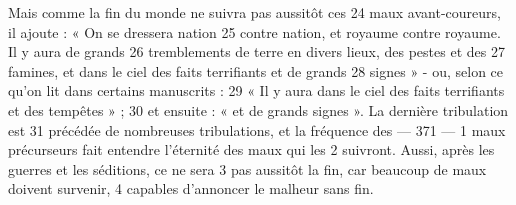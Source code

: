 Mais comme la fin du monde ne suivra pas aussitôt ces	 
24	 	maux avant-coureurs, il ajoute : « On se dressera nation	 
25	 	contre nation, et royaume contre royaume. Il y aura de grands	 
26	 	tremblements de terre en divers lieux, des pestes et des	 
27	 	famines, et dans le ciel des faits terrifiants et de grands	 
28	 	signes » - ou, selon ce qu'on lit dans certains manuscrits :	 
29	 	« Il y aura dans le ciel des faits terrifiants et des tempêtes » ;	 
30	 	et ensuite : « et de grands signes ». La dernière tribulation est	 
31	 	précédée de nombreuses tribulations, et la fréquence des	 
 	--- 371 ---	 
1	 	maux précurseurs fait entendre l'éternité des maux qui les	 
2	 	suivront. Aussi, après les guerres et les séditions, ce ne sera	 
3	 	pas aussitôt la fin, car beaucoup de maux doivent survenir,	 
4	 	capables d'annoncer le malheur sans fin.